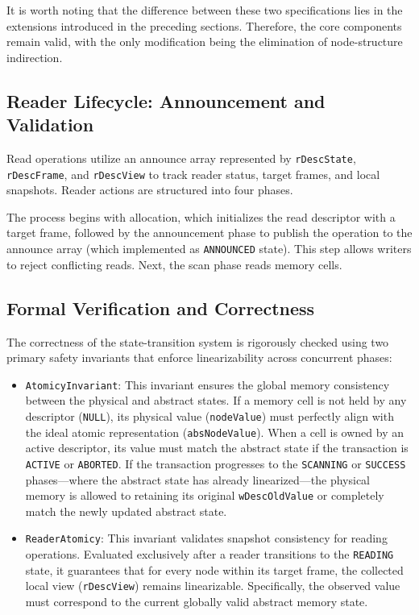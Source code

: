 It is worth noting that the difference between these two specifications lies in the extensions introduced in the preceding sections. Therefore, the core components remain valid, with the only modification being the elimination of node-structure indirection.

\subsection{Reader Lifecycle: Announcement and Validation}

Read operations utilize an announce array represented by \texttt{rDescState}, \texttt{rDescFrame}, and \texttt{rDescView} to track reader status, target frames, and local snapshots. Reader actions are structured into four phases.

The process begins with allocation, which initializes the read descriptor with a target frame, followed by the announcement phase to publish the operation to the announce array (which implemented as \texttt{ANNOUNCED} state). This step allows writers to reject conflicting reads. Next, the scan phase reads memory cells.

\subsection{Formal Verification and Correctness}

The correctness of the state-transition system is rigorously checked using two primary safety invariants that enforce linearizability across concurrent phases:
\begin{itemize}
    \item \texttt{AtomicyInvariant}: This invariant ensures the global memory consistency between the physical and abstract states. If a memory cell is not held by any descriptor (\texttt{NULL}), its physical value (\texttt{nodeValue}) must perfectly align with the ideal atomic representation (\texttt{absNodeValue}). When a cell is owned by an active descriptor, its value must match the abstract state if the transaction is \texttt{ACTIVE} or \texttt{ABORTED}. If the transaction progresses to the \texttt{SCANNING} or \texttt{SUCCESS} phases—where the abstract state has already linearized—the physical memory is allowed to retaining its original \texttt{wDescOldValue} or completely match the newly updated abstract state.

    \item \texttt{ReaderAtomicy}: This invariant validates snapshot consistency for reading operations. Evaluated exclusively after a reader transitions to the \texttt{READING} state, it guarantees that for every node within its target frame, the collected local view (\texttt{rDescView}) remains linearizable. Specifically, the observed value must correspond to the current globally valid abstract memory state.
\end{itemize}

